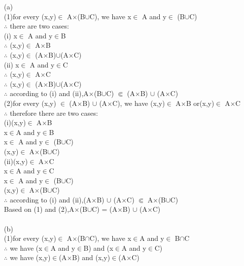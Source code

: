 \documentclass[11pt, a4paper, UTF8]{ctexart}
\begin{document}
\begin{solution}
(a)\\
(1)for every (x,y)$\in$ A$\times$(B$\cup$C), we have x$\in$ A and y$\in$ (B$\cup$C)\\
$\therefore$ there are two cases:\\
\indent (i) x$\in$ A and y$\in$B\\
\indent \indent $\therefore$ (x,y)$\in$ A$\times$B\\
\indent \indent $\therefore$ (x,y)$\in$ (A$\times$B)$\cup$(A$\times$C)\\
\indent (ii) x$\in$ A and y$\in$C\\
\indent \indent $\therefore$ (x,y)$\in$ A$\times$C\\
\indent \indent $\therefore$ (x,y)$\in$ (A$\times$B)$\cup$(A$\times$C)\\
$\therefore$ according to (i) and (ii),A$\times$(B$\cup$C) $\Subset$ (A$\times$B) $\cup$ (A$\times$C)\\
(2)for every (x,y) $\in$ (A$\times$B) $\cup$ (A$\times$C), we have (x,y)$\in$ A$\times$B or(x,y)$\in$ A$\times$C\\
$\therefore$ therefore there are two cases:\\
\indent (i)(x,y)$\in$ A$\times$B\\
\indent \indent x$\in$A and y$\in$B\\
\indent \indent x$\in$ A and y$\in$ (B$\cup$C)\\
\indent \indent (x,y)$\in$ A$\times$(B$\cup$C)\\
\indent (ii)(x,y)$\in$ A$\times$C\\
\indent \indent x$\in$A and y$\in$C\\
\indent \indent x$\in$ A and y$\in$ (B$\cup$C)\\
\indent \indent (x,y)$\in$ A$\times$(B$\cup$C)\\
$\therefore$ according to (i) and (ii),(A$\times$B) $\cup$ (A$\times$C) $\Subset$ A$\times$(B$\cup$C)\\
Based on (1) and (2),A$\times$(B$\cup$C) = (A$\times$B) $\cup$ (A$\times$C)\\
\\
(b)\\
(1)for every (x,y)$\in$ A$\times$(B$\cap$C), we have x$\in$A and y$\in$ B$\cap$C\\
$\therefore$ we have (x$\in$A and y$\in$B) and (x$\in$A and y$\in$C)\\
$\therefore$ we have (x,y)$\in$(A$\times$B) and (x,y)$\in$(A$\times$C)\\

\end{solution}
\end{document}
